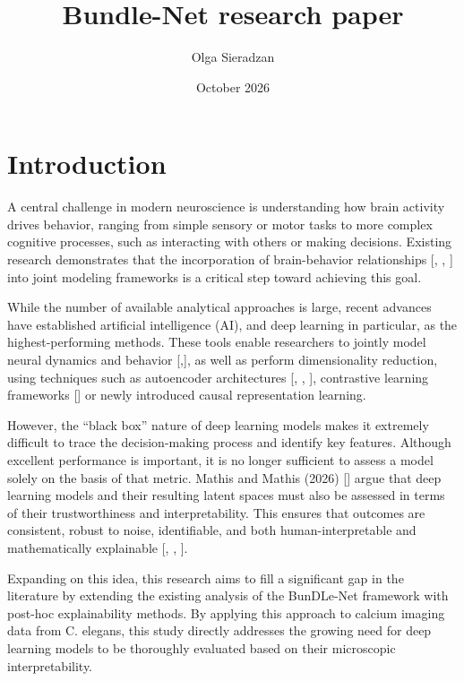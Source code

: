 \documentclass{article}
\title{Bundle-Net research paper}
\author{Olga Sieradzan}
\date{October 2026}
\begin{document}
\maketitle

\section{Introduction}

A central challenge in modern neuroscience is understanding how brain activity drives behavior, ranging from simple sensory or motor tasks to more complex cognitive processes, such as interacting with others or making decisions. Existing research demonstrates that the incorporation of brain-behavior relationships [\cite{krakauer2017neuroscience}, \cite{pereira2020quantifying}, \cite{mathis2024decoding}] into joint modeling frameworks is a critical step toward achieving this goal.

While the number of available analytical approaches is large, recent advances have established artificial intelligence (AI), and deep learning in particular, as the highest-performing methods. These tools enable researchers to jointly model neural dynamics and behavior [\cite{vyas2020computation},\cite{hurwitz2021building}], as well as perform dimensionality reduction, using techniques such as autoencoder architectures [\cite{wahlstrom2015pixels}, \cite{watter2015embed}, \cite{pandarinath2018inferring}], contrastive learning frameworks [\cite{schneider2023learnable}] or newly introduced causal representation learning.

However, the “black box” nature of deep learning models makes it extremely difficult to trace the decision-making process and identify key features. Although excellent performance is important, it is no longer sufficient to assess a model solely on the basis of that metric. Mathis and Mathis (2026) [\cite{mathis2026joint}] argue that deep learning models and their resulting latent spaces must also be assessed in terms of their trustworthiness and interpretability. This ensures that outcomes are consistent, robust to noise, identifiable, and both human-interpretable and mathematically explainable [\cite{schneider2023learnable}, \cite{hyvarinen1999nonlinear}, \cite{lipton2018mythos}].

Expanding on this idea, this research aims to fill a significant gap in the literature by extending the existing analysis of the BunDLe-Net framework with post-hoc explainability methods. By applying this approach to calcium imaging data from C. elegans, this study directly addresses the growing need for deep learning models to be thoroughly evaluated based on their microscopic interpretability.
\end{document}
